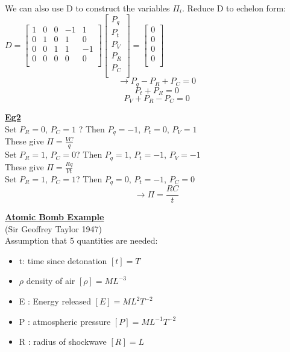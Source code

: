 \documentclass[12pt]{article}
\newcommand{\myt}[1]{\textbf{\underline{#1}}}
\begin{document}
	We can also use D to construct the variables $\Pi_i$. Reduce D to echelon form:\\
	$
	D =
	\begin{bmatrix}
		1 & 0 & 0 & -1 & 1 \\
		0 & 1 & 0 &  1 & 0 \\
		0 & 0 & 1 & 1 & -1 \\
		0 & 0 & 0 & 0 & 0 \\
	\end{bmatrix}
	\begin{bmatrix}
		P_q \\
		P_t \\
		P_V \\
		P_R \\
		P_C \\
	\end{bmatrix}
	=
	\begin{bmatrix}
		0 \\
		0 \\
		0 \\
		0 \\
	\end{bmatrix}
	$\\
	$$\rightarrow P_q - P_R + P_C = 0$$
	$$P_t + P_R = 0$$
	$$P_V + P_R - P_C = 0$$
	
	\myt{Eg2}\\
	Set $P_R = 0$, $P_C = 1$ ? Then $P_q = -1$, $P_t = 0$, $P_V = 1$\\
	These give $\Pi = \frac{VC}{q}$\\
	Set $P_R = 1$, $P_C = 0$? Then $P_q = 1$, $P_t = -1$, $P_V = -1$\\
	These give $\Pi = \frac{Rq}{Vt}$\\
	Set $P_R = 1$, $P_C =1$? Then $P_q = 0$, $P_t = -1$, $P_C = 0$\\
	$$\rightarrow \Pi = \frac{RC}{t}$$
	
	\myt{Atomic Bomb Example}\\
	(Sir Geoffrey Taylor 1947)\\
	Assumption that 5 quantities are needed:\\
	\begin{itemize}
		\item t: time since detonation $[t] = T$
		\item $\rho$ density of air $[\rho] = ML^{-3}$
		\item E : Energy released $[E] = ML^2T^{-2}$
		\item P : atmospheric pressure $[P] = ML^{-1}T^{-2}$
		\item R : radius of shockwave $[R] = L$
	\end{itemize}
\end{document}
